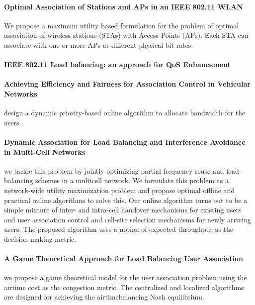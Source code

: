 \documentclass[journal,transmag]{IEEEtran}
\begin{document}
\paragraph{Optimal Association of Stations and APs in an IEEE 802.11 WLAN \cite{05optimal_association_stations}}
We propose a maximum utility based formulation for the problem of optimal association of wireless stations (STAs) with Access Points (APs). Each STA can associate with one or more APs at different physical bit rates.





\paragraph{IEEE 802.11 Load balancing: an approach for QoS Enhancement\cite{08load_balancing_QOS}}

\paragraph{Achieving Efficiency and Fairness for Association Control in Vehicular Networks \cite{09achieving_effeciency_fairness_vehicular}}
design a dynamic priority-based online algorithm to allocate bandwidth for the users.


\paragraph{Dynamic Association for Load Balancing and Interference Avoidance in Multi-Cell Networks \cite{09dynamic_association_load_balancing}}
we tackle this problem by jointly optimizing partial frequency reuse and load-balancing schemes in a multicell network. We formulate this problem as a network-wide utility maximization problem and propose optimal offline and practical online algorithms to solve this. Our online algorithm turns out to be a simple mixture of inter- and intra-cell handover mechanisms for existing users and user association control and cell-site selection mechanisms for newly arriving users. The proposed algorithm uses a notion of expected throughput as the decision making metric.



\paragraph{A Game Theoretical Approach for Load Balancing User Association \cite{10game_load_balancing_association}} 
we propose a game theoretical model for the user association problem using the airtime cost as the congestion metric. The centralized and localized algorithms are designed for achieving the airtimebalancing Nash equilibrium.
\end{document}
